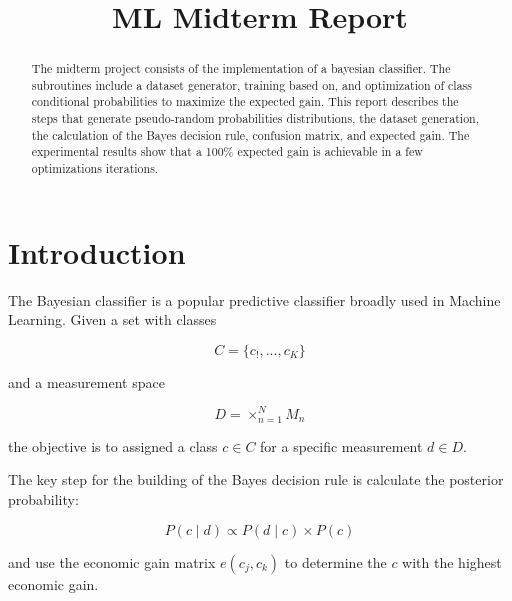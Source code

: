 \documentclass[letterpaper, conference]{IEEEtran}
\begin{document}
\title{ML Midterm Report}

\author{
}

\maketitle

\begin{abstract}
The midterm project consists of the implementation of a bayesian classifier. The subroutines include a dataset generator, training based on, and optimization of class conditional probabilities to maximize the expected gain. This report describes the steps that generate pseudo-random probabilities distributions, the dataset generation, the calculation of the Bayes decision rule, confusion matrix, and expected gain. The experimental results show that a 100\% expected gain is achievable in a few optimizations iterations.
\end{abstract}

\section{Introduction}

The Bayesian classifier is a popular predictive classifier broadly used in Machine Learning. Given a set with classes

\begin{equation}
C = \{c_!, ..., c_K\}
\end{equation}

and a measurement space

\begin{equation}
D = \times_{n=1}^{N}M_n
\end{equation}

the objective is to assigned a class $c \in C$ for a specific measurement $d \in D$.

The key step for the building of the Bayes decision rule is calculate the posterior probability:

\begin{equation}
P(c \mid d) \propto P(d \mid c) \times P(c)
\end{equation}

and use the economic gain matrix $e(c_j, c_k)$ to determine the $c$ with the highest economic gain.
\end{document}
